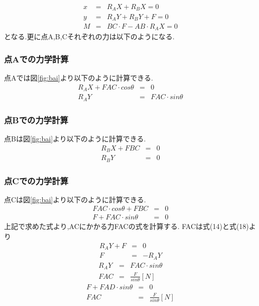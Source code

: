 \documentclass[12pt,oneside]{sotsuken_paper}
\begin{document}
\begin{eqnarray} 
	x & = & R_AX+R_BX=0 \\ 
	y & = & R_AY+R_BY+F=0 \\ 
	M & = & BC\cdot F-AB\cdot R_AX=0 
\end{eqnarray} 
となる.更に点A,B,Cそれぞれの力は以下のようになる. 

\subsubsection{点Aでの力学計算} 
点Aでは図\ref{fig:bai}より以下のように計算できる. 
\begin{eqnarray} 
	R_AX+FAC\cdot cosθ & = & 0 \\ 
	R_AY & = & FAC\cdot sinθ 
\end{eqnarray} 
\subsubsection{点Bでの力学計算} 
点Bは図\ref{fig:bai}より以下のように計算できる. 
\begin{eqnarray} 
	R_BX+FBC & = & 0 \\ 
	R_BY & = & 0 
\end{eqnarray} 
\subsubsection{点Cでの力学計算} 
点Cは図\ref{fig:bai}より以下のように計算できる. 
\begin{eqnarray} 
	FAC\cdot cosθ+FBC & = & 0 \\ 
	F+FAC\cdot sinθ & = & 0 
\end{eqnarray} 
上記で求めた式より,ACにかかる力FACの式を計算する. 
FACは式(14)と式(18)より 
\begin{eqnarray} 
	R_AY+F & = & 0 \\ 
		F & = & -R_AY 
\end{eqnarray} 
\begin{eqnarray} 
	　　　　R_AY & = & FAC\cdot sinθ \\ 
		FAC & = & \frac{F}{sinθ} [N] 
\end{eqnarray} 
\begin{eqnarray} 
	F+FAD\cdot sinθ & = & 0 \\ 
	FAC & = & \frac{F}{sinθ} [N] 
\end{eqnarray} 
\end{document}

